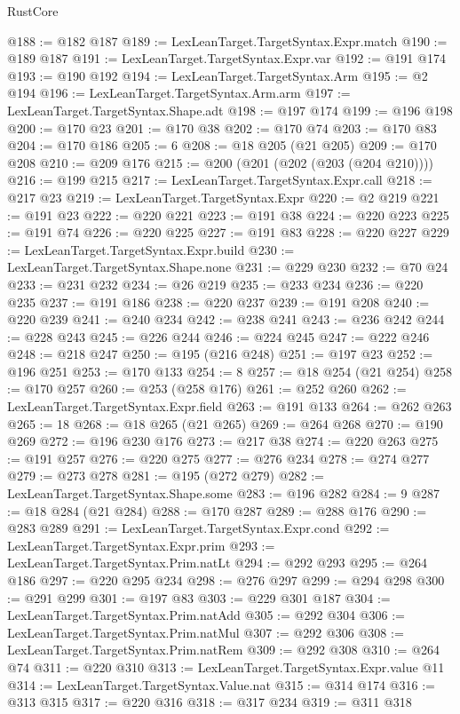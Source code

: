\begin{lexlean}{RustCore}
\begin{coremodule}
@188 := @182 @187
@189 := LexLeanTarget.TargetSyntax.Expr.match
@190 := @189 @187
@191 := LexLeanTarget.TargetSyntax.Expr.var
@192 := @191 @174
@193 := @190 @192
@194 := LexLeanTarget.TargetSyntax.Arm
@195 := @2 @194
@196 := LexLeanTarget.TargetSyntax.Arm.arm
@197 := LexLeanTarget.TargetSyntax.Shape.adt
@198 := @197 @174
@199 := @196 @198
@200 := @170 @23
@201 := @170 @38
@202 := @170 @74
@203 := @170 @83
@204 := @170 @186
@205 := 6
@208 := @18 @205 (@21 @205)
@209 := @170 @208
@210 := @209 @176
@215 := @200 (@201 (@202 (@203 (@204 @210))))
@216 := @199 @215
@217 := LexLeanTarget.TargetSyntax.Expr.call
@218 := @217 @23
@219 := LexLeanTarget.TargetSyntax.Expr
@220 := @2 @219
@221 := @191 @23
@222 := @220 @221
@223 := @191 @38
@224 := @220 @223
@225 := @191 @74
@226 := @220 @225
@227 := @191 @83
@228 := @220 @227
@229 := LexLeanTarget.TargetSyntax.Expr.build
@230 := LexLeanTarget.TargetSyntax.Shape.none
@231 := @229 @230
@232 := @70 @24
@233 := @231 @232
@234 := @26 @219
@235 := @233 @234
@236 := @220 @235
@237 := @191 @186
@238 := @220 @237
@239 := @191 @208
@240 := @220 @239
@241 := @240 @234
@242 := @238 @241
@243 := @236 @242
@244 := @228 @243
@245 := @226 @244
@246 := @224 @245
@247 := @222 @246
@248 := @218 @247
@250 := @195 (@216 @248)
@251 := @197 @23
@252 := @196 @251
@253 := @170 @133
@254 := 8
@257 := @18 @254 (@21 @254)
@258 := @170 @257
@260 := @253 (@258 @176)
@261 := @252 @260
@262 := LexLeanTarget.TargetSyntax.Expr.field
@263 := @191 @133
@264 := @262 @263
@265 := 18
@268 := @18 @265 (@21 @265)
@269 := @264 @268
@270 := @190 @269
@272 := @196 @230 @176
@273 := @217 @38
@274 := @220 @263
@275 := @191 @257
@276 := @220 @275
@277 := @276 @234
@278 := @274 @277
@279 := @273 @278
@281 := @195 (@272 @279)
@282 := LexLeanTarget.TargetSyntax.Shape.some
@283 := @196 @282
@284 := 9
@287 := @18 @284 (@21 @284)
@288 := @170 @287
@289 := @288 @176
@290 := @283 @289
@291 := LexLeanTarget.TargetSyntax.Expr.cond
@292 := LexLeanTarget.TargetSyntax.Expr.prim
@293 := LexLeanTarget.TargetSyntax.Prim.natLt
@294 := @292 @293
@295 := @264 @186
@297 := @220 @295 @234
@298 := @276 @297
@299 := @294 @298
@300 := @291 @299
@301 := @197 @83
@303 := @229 @301 @187
@304 := LexLeanTarget.TargetSyntax.Prim.natAdd
@305 := @292 @304
@306 := LexLeanTarget.TargetSyntax.Prim.natMul
@307 := @292 @306
@308 := LexLeanTarget.TargetSyntax.Prim.natRem
@309 := @292 @308
@310 := @264 @74
@311 := @220 @310
@313 := LexLeanTarget.TargetSyntax.Expr.value @11
@314 := LexLeanTarget.TargetSyntax.Value.nat
@315 := @314 @174
@316 := @313 @315
@317 := @220 @316
@318 := @317 @234
@319 := @311 @318

\end{coremodule}
\end{lexlean}
